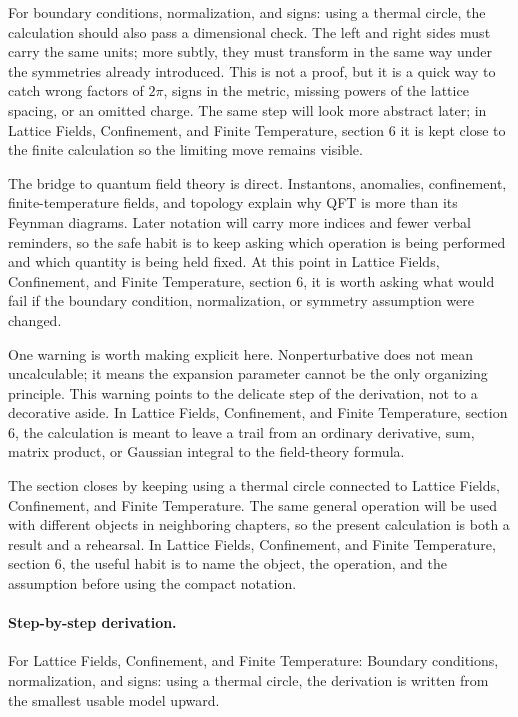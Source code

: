 For boundary conditions, normalization, and signs: using a thermal circle, the calculation should also pass a dimensional check.  The left and right sides must carry the same units; more subtly, they must transform in the same way under the symmetries already introduced.  This is not a proof, but it is a quick way to catch wrong factors of \(2\pi\), signs in the metric, missing powers of the lattice spacing, or an omitted charge.  The same step will look more abstract later; in Lattice Fields, Confinement, and Finite Temperature, section 6 it is kept close to the finite calculation so the limiting move remains visible.

The bridge to quantum field theory is direct.  Instantons, anomalies, confinement, finite-temperature fields, and topology explain why QFT is more than its Feynman diagrams.  Later notation will carry more indices and fewer verbal reminders, so the safe habit is to keep asking which operation is being performed and which quantity is being held fixed.  At this point in Lattice Fields, Confinement, and Finite Temperature, section 6, it is worth asking what would fail if the boundary condition, normalization, or symmetry assumption were changed.

One warning is worth making explicit here.  Nonperturbative does not mean uncalculable; it means the expansion parameter cannot be the only organizing principle.  This warning points to the delicate step of the derivation, not to a decorative aside.  In Lattice Fields, Confinement, and Finite Temperature, section 6, the calculation is meant to leave a trail from an ordinary derivative, sum, matrix product, or Gaussian integral to the field-theory formula.

The section closes by keeping using a thermal circle connected to Lattice Fields, Confinement, and Finite Temperature.  The same general operation will be used with different objects in neighboring chapters, so the present calculation is both a result and a rehearsal.  In Lattice Fields, Confinement, and Finite Temperature, section 6, the useful habit is to name the object, the operation, and the assumption before using the compact notation.



\paragraph{Step-by-step derivation.}

For Lattice Fields, Confinement, and Finite Temperature: Boundary conditions, normalization, and signs: using a thermal circle, the derivation is written from the smallest usable model upward.

